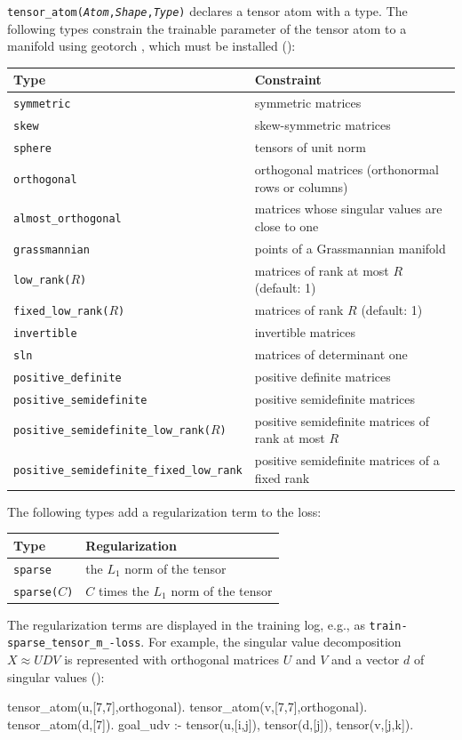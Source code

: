 \documentclass[a4paper]{report}
\begin{document}
{\tt tensor\_atom({\it Atom},{\it Shape},{\it Type})} declares a
tensor atom with a type.  The following types constrain the trainable
parameter of the tensor atom to a manifold using geotorch
\cite{lezcano2019trivializations}, which must be installed ():
\begin{center}
	\begin{tabular}{ll}
		\toprule
		Type & Constraint \\
		\midrule
		{\tt symmetric} & symmetric matrices \\
		{\tt skew} & skew-symmetric matrices \\
		{\tt sphere} & tensors of unit norm \\
		{\tt orthogonal} & orthogonal matrices (orthonormal rows or columns) \\
		{\tt almost\_orthogonal} & matrices whose singular values are close to one \\
		{\tt grassmannian} & points of a Grassmannian manifold \\
		{\tt low\_rank($R$)} & matrices of rank at most $R$ (default: 1) \\
		{\tt fixed\_low\_rank($R$)} & matrices of rank $R$ (default: 1) \\
		{\tt invertible} & invertible matrices \\
		{\tt sln} & matrices of determinant one \\
		{\tt positive\_definite} & positive definite matrices \\
		{\tt positive\_semidefinite} & positive semidefinite matrices \\
		{\tt positive\_semidefinite\_low\_rank($R$)} & positive semidefinite matrices of rank at most $R$ \\
		{\tt positive\_semidefinite\_fixed\_low\_rank} & positive semidefinite matrices of a fixed rank \\
		\bottomrule
	\end{tabular}
\end{center}
The following types add a regularization term to the loss:
\begin{center}
	\begin{tabular}{ll}
		\toprule
		Type & Regularization \\
		\midrule
		{\tt sparse} & the $L_1$ norm of the tensor \\
		{\tt sparse($C$)} & $C$ times the $L_1$ norm of the tensor \\
		\bottomrule
	\end{tabular}
\end{center}
The regularization terms are displayed in the training log, e.g., as
{\tt train-sparse\_tensor\_m\_-loss}.  For example, the singular value
decomposition $X\approx UDV$ is represented with orthogonal matrices $U$
and $V$ and a vector $d$ of singular values ():
\begin{prologcode}
tensor_atom(u,[7,7],orthogonal).
tensor_atom(v,[7,7],orthogonal).
tensor_atom(d,[7]).
goal_udv :- tensor(u,[i,j]), tensor(d,[j]), tensor(v,[j,k]).
\end{prologcode}
\end{document}
